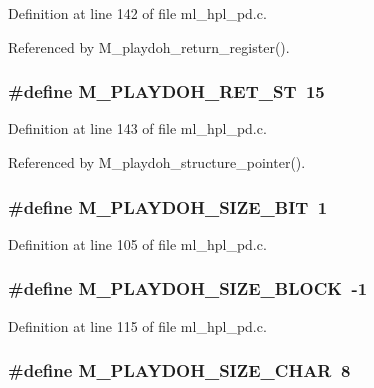 Definition at line 142 of file ml\_\-hpl\_\-pd.c.

Referenced by M\_\-playdoh\_\-return\_\-register().
\subsubsection{\setlength{\rightskip}{0pt plus 5cm}\#define M\_\-PLAYDOH\_\-RET\_\-ST~15}\label{ml__hpl__pd_8c_95db1aef8bf1cb69d579f0724234caa9}




Definition at line 143 of file ml\_\-hpl\_\-pd.c.

Referenced by M\_\-playdoh\_\-structure\_\-pointer().
\subsubsection{\setlength{\rightskip}{0pt plus 5cm}\#define M\_\-PLAYDOH\_\-SIZE\_\-BIT~1}\label{ml__hpl__pd_8c_4531b24f92567ccc075799e29bda3c99}




Definition at line 105 of file ml\_\-hpl\_\-pd.c.
\subsubsection{\setlength{\rightskip}{0pt plus 5cm}\#define M\_\-PLAYDOH\_\-SIZE\_\-BLOCK~-1}\label{ml__hpl__pd_8c_7a2542d0056fb3a397c077736010cbb4}




Definition at line 115 of file ml\_\-hpl\_\-pd.c.
\subsubsection{\setlength{\rightskip}{0pt plus 5cm}\#define M\_\-PLAYDOH\_\-SIZE\_\-CHAR~8}\label{ml__hpl__pd_8c_2d48f3c6f016736b4a42ca096919971b}




